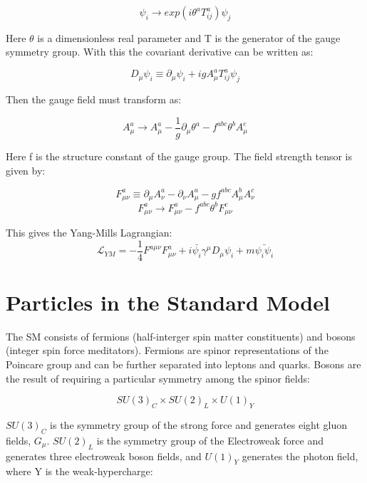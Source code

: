 \begin{equation}
\psi_{i} \rightarrow exp(i\theta^{a}T^{a}_{ij})\psi_{j}
\end{equation}

Here $\theta$ is a dimensionless real parameter and T is the generator of the gauge symmetry group. With this the covariant derivative can be written as:

\begin{equation}
D_{\mu}\psi_{i} \equiv \partial_{\mu}\psi_{i} + igA^{a}_{\mu}T^{a}_{ij}\psi_{j}
\end{equation}

Then the gauge field must transform as:

\begin{equation}
A^{a}_{\mu} \rightarrow A^{a}_{\mu} - \frac{1}{g}\partial_{\mu}\theta^{a} - f^{abc} \theta^{b} A_{\mu}^{c}
\end{equation}

Here f is the structure constant of the gauge group. The field strength tensor is given by:

\begin{equation}
F^{a}_{\mu\nu} \equiv \partial_{\mu}A^{a}_{\nu} - \partial_{\nu}A^{a}_{\mu} - gf^{abc}A^{b}_{\mu}A^{c}_{\nu}
\end{equation}
\begin{equation}
F^{a}_{\mu\nu} \rightarrow F^{a}_{\mu\nu} - f^{abc} \theta^{b}F^{c}_{\mu\nu}
\end{equation}

This gives the Yang-Mills Lagrangian:
\begin{equation}
\mathcal{L}_{YM}= -\frac{1}{4}F^{a\mu\nu}F^{a}_{\mu\nu}+i\bar{\psi_{i}}\gamma^{\mu}D_{\mu}\psi_{i}+m\bar{\psi_{i}\psi_{i}}
\end{equation}
\section{Particles in the Standard Model}
The SM consists of fermions (half-interger spin matter constituents) and bosons (integer spin force meditators). Fermions are spinor representations of the Poincare group and can be further separated into leptons and quarks. Bosons are the result of requiring a particular symmetry among the spinor fields:

\begin{equation}
SU(3)_{C} \times SU(2)_{L} \times U(1)_{Y}
\end{equation}

$SU(3)_{C}$ is the symmetry group of the strong force and generates eight gluon fields, $G_{\mu}$. $SU(2)_{L}$ is the symmetry group of the Electroweak force and generates three electroweak boson fields, and $U(1)_{Y}$ generates the photon field, where Y is the weak-hypercharge:

